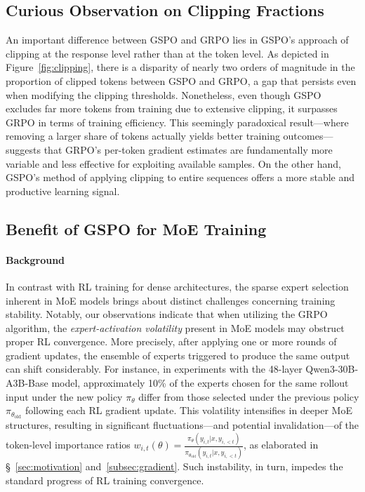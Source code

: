 \subsection{Curious Observation on Clipping Fractions}

An important difference between GSPO and GRPO lies in GSPO's approach of clipping at the response level rather than at the token level. As depicted in Figure~\ref{fig:clipping}, there is a disparity of nearly two orders of magnitude in the proportion of clipped tokens between GSPO and GRPO, a gap that persists even when modifying the clipping thresholds. Nonetheless, even though GSPO excludes far more tokens from training due to extensive clipping, it surpasses GRPO in terms of training efficiency. This seemingly paradoxical result—where removing a larger share of tokens actually yields better training outcomes—suggests that GRPO’s per-token gradient estimates are fundamentally more variable and less effective for exploiting available samples. On the other hand, GSPO’s method of applying clipping to entire sequences offers a more stable and productive learning signal.

\subsection{Benefit of GSPO for MoE Training}
\label{subsec:routing_replay}

\paragraph{Background}
In contrast with RL training for dense architectures, the sparse expert selection inherent in MoE models brings about distinct challenges concerning training stability. Notably, our observations indicate that when utilizing the GRPO algorithm, the \textit{expert-activation volatility} present in MoE models may obstruct proper RL convergence. More precisely, after applying one or more rounds of gradient updates, the ensemble of experts triggered to produce the same output can shift considerably. For instance, in experiments with the 48-layer Qwen3-30B-A3B-Base model, approximately 10\% of the experts chosen for the same rollout input under the new policy $\pi_{\theta}$ differ from those selected under the previous policy $\pi_{\theta_\text{old}}$ following each RL gradient update. This volatility intensifies in deeper MoE structures, resulting in significant fluctuations—and potential invalidation—of the token-level importance ratios $w_{i,t}(\theta) = \frac{ \pi_{\theta} (y_{i,t} | x, y_{i,<t}) }{ \pi_{\theta_\text{old}} (y_{i,t} | x,y_{i,<t})}$, as elaborated in \S~\ref{sec:motivation} and~\ref{subsec:gradient}. Such instability, in turn, impedes the standard progress of RL training convergence.

